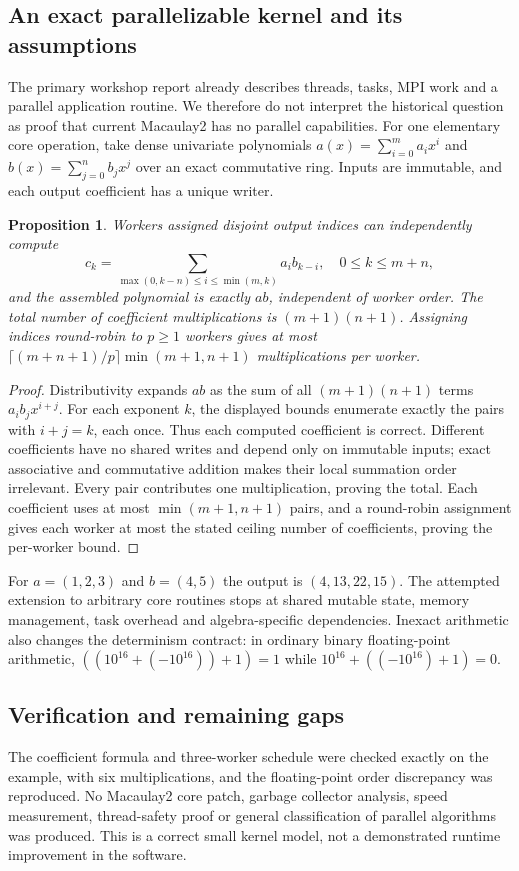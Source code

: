 \documentclass[11pt]{article}
\newtheorem{proposition}{Proposition}
\begin{document}
\subsection{An exact parallelizable kernel and its assumptions}
The primary workshop report already describes threads, tasks, MPI work and a parallel application routine. We therefore do not interpret the historical question as proof that current Macaulay2 has no parallel capabilities. For one elementary core operation, take dense univariate polynomials $a(x)=\sum_{i=0}^m a_ix^i$ and $b(x)=\sum_{j=0}^n b_jx^j$ over an exact commutative ring. Inputs are immutable, and each output coefficient has a unique writer.
\begin{proposition}
Workers assigned disjoint output indices can independently compute
\[
c_k=\sum_{\max(0,k-n)\le i\le\min(m,k)}a_i b_{k-i},\quad 0\le k\le m+n,
\]
and the assembled polynomial is exactly $ab$, independent of worker order. The total number of coefficient multiplications is $(m+1)(n+1)$. Assigning indices round-robin to $p\ge1$ workers gives at most $\lceil(m+n+1)/p\rceil\min(m+1,n+1)$ multiplications per worker.
\end{proposition}
\begin{proof}
Distributivity expands $ab$ as the sum of all $(m+1)(n+1)$ terms $a_i b_jx^{i+j}$. For each exponent $k$, the displayed bounds enumerate exactly the pairs with $i+j=k$, each once. Thus each computed coefficient is correct. Different coefficients have no shared writes and depend only on immutable inputs; exact associative and commutative addition makes their local summation order irrelevant. Every pair contributes one multiplication, proving the total. Each coefficient uses at most $\min(m+1,n+1)$ pairs, and a round-robin assignment gives each worker at most the stated ceiling number of coefficients, proving the per-worker bound.
\end{proof}
For $a=(1,2,3)$ and $b=(4,5)$ the output is $(4,13,22,15)$. The attempted extension to arbitrary core routines stops at shared mutable state, memory management, task overhead and algebra-specific dependencies. Inexact arithmetic also changes the determinism contract: in ordinary binary floating-point arithmetic, $((10^{16}+(-10^{16}))+1)=1$ while $10^{16}+((-10^{16})+1)=0$.
\subsection{Verification and remaining gaps}
The coefficient formula and three-worker schedule were checked exactly on the example, with six multiplications, and the floating-point order discrepancy was reproduced. No Macaulay2 core patch, garbage collector analysis, speed measurement, thread-safety proof or general classification of parallel algorithms was produced. This is a correct small kernel model, not a demonstrated runtime improvement in the software.
\end{document}
